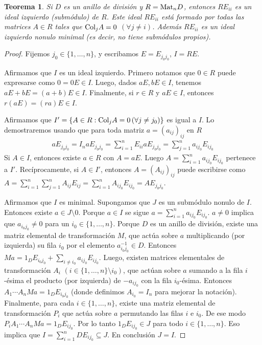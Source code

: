 \documentclass{report}
\newcommand{\Mat}{\textnormal{Mat}}
\newcommand{\Col}{\textnormal{Col}}
\newtheorem{theorem}{Teorema}
\begin{document}
  \begin{theorem}
    Si \(D\) es un anillo de división y \(R = \Mat_n D\), entonces \(R E_{i i}\) es un ideal izquierdo (submódulo) de \(R\).
    Este ideal \(R E_{i i}\) está formado por todas las matrices \(A \in R\) tales que \(\Col_j A = 0\) \((\forall j \neq i)\).
    Además \(R E_{i i}\) es un ideal izquierdo nonulo minimal (es decir, no tiene submódulos propios).
  \end{theorem}
  \begin{proof}
    Fijemos \(j_0 \in \{1, \dots, n\}\), y escribamos \(E = E_{j_0 j_0}\), \(I = R E\).

    Afirmamos que \(I\) es un ideal izquierdo.
    Primero notamos que \(0 \in R\) puede expresarse como \(0 = 0 E \in I\).
    Luego, dados \(a E, b E \in I\), tenemos \(a E + b E = (a + b) E \in I\).
    Finalmente, si \(r \in R\) y \(a E \in I\), entonces \(r (a E) = (r a) E \in I\).

    Afirmamos que \(I' = \{A \in R : \Col_j A = 0 \, (\forall j \neq j_0)\}\) es igual a \(I\).
    Lo demostraremos usando que para toda matriz \(a = (a_{i j})_{i j}\) en \(R\)
    \begin{align}
      a E_{j_0 j_0}
      =
      I_n a E_{j_0 j_0}
      =
      \sum_{i = 1}^n E_{i i} a E_{j_0 j_0}
      =
      \sum_{j = 1}^n a_{i j_0} E_{i j_0}
    \end{align}
    Si \(A \in I\), entonces existe \(a \in R\) con \(A = a E\).
    Luego \(A = \sum_{i = 1}^n a_{i j_0} E_{i j_0}\) pertenece a \(I'\).
    Recíprocamente, si \(A \in I'\), entonces \(A = (A_{i j})_{i j}\) puede escribirse como \(A = \sum_{i = 1}^n \sum_{j = 1}^n A_{i j} E_{i j} = \sum_{i = 1}^n A_{i j_0} E_{i j_0} = A E_{j_0 j_0}\).

    Afirmamos que \(I\) es minimal.
    Supongamos que \(J\) es un submódulo nonulo de \(I\).
    Entonces existe \(a \in J \setminus 0\).
    Porque \(a \in I\) se sigue \(a = \sum_{i = 1}^n a_{i j_0} E_{i j_0}\).
    \(a \neq 0\) implica que \(a_{i_0 j_0} \neq 0\) para un \(i_0 \in \{1, \dots, n\}\).
    Porque \(D\) es un anillo de división, existe una matriz elemental de transformación \(M\), que actúa sobre \(a\) multiplicando (por izquierda) su fila \(i_0\) por el elemento \(a_{i_0 j_0}^{- 1} \in D\).
    Entonces \(M a = 1_D E_{i_0 j_0} + \sum_{i \neq i_0} a_{i j_0} E_{i j_0}\).
    Luego, existen matrices elementales de transformación \(A_i\) \((i \in \{1, \dots, n\} \setminus i_0)\), que actúan sobre \(a\) sumando a la fila \(i\)-ésima el producto (por izquierda) de \(- a_{i j_0}\) con la fila \(i_0\)-ésima.
    Entonces \(A_1 \cdots A_n M a = 1_D E_{i_0 j_0}\) (donde definimos \(A_{i_0} = I_n\) para mejorar la notación).
    Finalmente, para cada \(i \in \{1, \dots, n\}\), existe una matriz elemental de transformación \(P_i\) que actúa sobre \(a\) permutando las filas \(i\) e \(i_0\).
    De ese modo \(P_i A_1 \cdots A_n M a = 1_D E_{i j_0}\).
    Por lo tanto \(1_D E_{i j_0} \in J\) para todo \(i \in \{1, \dots, n\}\).
    Eso implica que \(I = \sum_{i = 1}^n D E_{i j_0} \subseteq J\).
    En conclusión \(J = I\).
  \end{proof}
\end{document}
